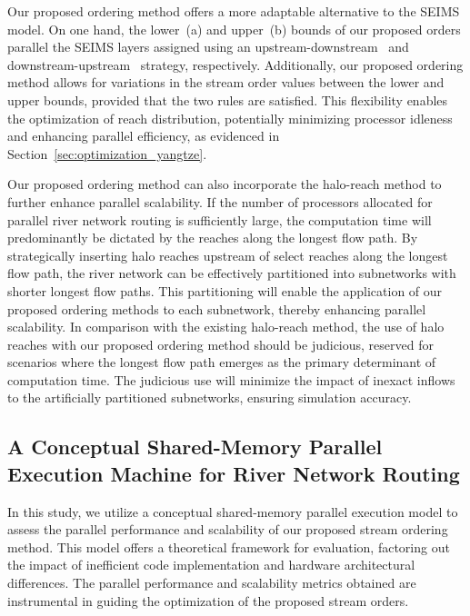\documentclass[water,article,submit,pdftex,moreauthors]{Definitions/mdpi}
\begin{document}
Our proposed ordering method offers a more adaptable alternative to the SEIMS model. On one hand, the lower~(a) and upper~(b) bounds of our proposed orders parallel the SEIMS layers assigned using an upstream-downstream~\cite[Fig. 6b]{zhu2019EMS} and downstream-upstream~\cite[Fig. 6c]{zhu2019EMS} strategy, respectively. Additionally, our proposed ordering method allows for variations in the stream order values between the lower and upper bounds, provided that the two rules are satisfied. This flexibility enables the optimization of reach distribution, potentially minimizing processor idleness and enhancing parallel efficiency, as evidenced in Section~\ref{sec:optimization_yangtze}.

Our proposed ordering method can also incorporate the halo-reach method to further enhance parallel scalability. If the number of processors allocated for parallel river network routing is sufficiently large, the computation time will predominantly be dictated by the reaches along the longest flow path. By strategically inserting halo reaches upstream of select reaches along the longest flow path, the river network can be effectively partitioned into subnetworks with shorter longest flow paths. This partitioning will enable the application of our proposed ordering methods to each subnetwork, thereby enhancing parallel scalability. In comparison with the existing halo-reach method, the use of halo reaches with our proposed ordering method should be judicious, reserved for scenarios where the longest flow path emerges as the primary determinant of computation time. The judicious use will minimize the impact of inexact inflows to the artificially partitioned subnetworks, ensuring simulation accuracy.

\subsection{A Conceptual Shared-Memory Parallel Execution Machine for River Network Routing}
\label{sec:parallel_machine}

In this study, we utilize a conceptual shared-memory parallel execution model to assess the parallel performance and scalability of our proposed stream ordering method. This model offers a theoretical framework for evaluation, factoring out the impact of inefficient code implementation and hardware architectural differences. The parallel performance and scalability metrics obtained are instrumental in guiding the optimization of the proposed stream orders.
\end{document}

